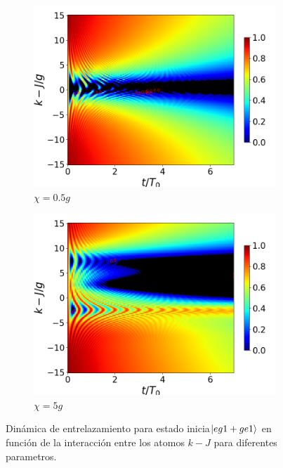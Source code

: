 \begin{figure}[h!]
    \begin{subfigure}{0.49\textwidth}
        \includegraphics[width=\textwidth]{figuras/ch4/concu/k/eg1+ge1 d=0.0g x=0.5g J=15.0g gamma=0.25g concu k dis.png}
        \caption{$\chi=0.5g$}
        \label{fig4:concu k 1 x1}
    \end{subfigure}
    \hfill
    \begin{subfigure}{0.49\textwidth}
        \includegraphics[width=\textwidth]{figuras/ch4/concu/k/eg1+ge1 d=0.0g x=5.0g J=15.0g gamma=0.25g concu k dis.png}
        \caption{$\chi=5g$}
        \label{fig4:concu k 1 x2}
    \end{subfigure}
    \caption{Dinámica de entrelazamiento para estado inicia$\ket{eg1+ge1}$ en función de la interacción entre los atomos $k-J$ para diferentes parametros.}
    \label{fig4:concu k params 1}
\end{figure}


